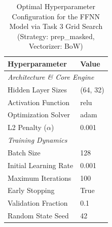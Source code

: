 \begin{table}[H]
    \centering
    \caption{Optimal Hyperparameter Configuration for the FFNN Model via Task 3 Grid Search (Strategy: prep_masked, Vectorizer: BoW)}
    \label{tab:task3_ffnn_hyperparameters}
    \small
    \begin{tabular}{ll}
    \toprule
    \textbf{Hyperparameter} & \textbf{Value} \\
    \midrule
    \multicolumn{2}{l}{\textit{Architecture \& Core Engine}} \\
    Hidden Layer Sizes & (64, 32) \\
    Activation Function & relu \\
    Optimization Solver & adam \\
    L2 Penalty ($\alpha$) & 0.001 \\
    \midrule
    \multicolumn{2}{l}{\textit{Training Dynamics}} \\
    Batch Size & 128 \\
    Initial Learning Rate & 0.001 \\
    Maximum Iterations & 100 \\
    Early Stopping & True \\
    Validation Fraction & 0.1 \\
    Random State Seed & 42 \\
    \bottomrule
    \end{tabular}
    \end{table}
